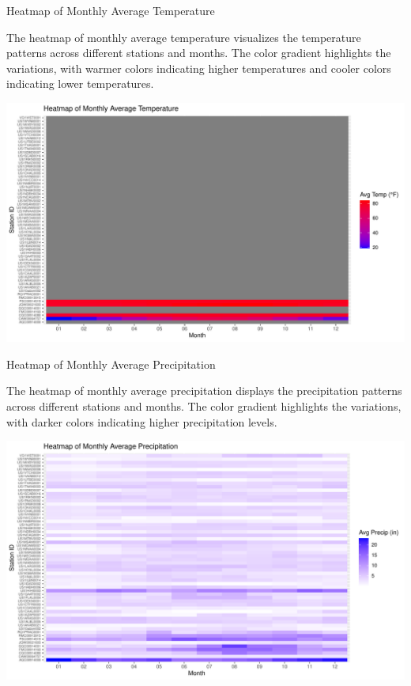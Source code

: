 \documentclass[
]{article}
\begin{document}
Heatmap of Monthly Average Temperature

\justifying

The heatmap of monthly average temperature visualizes the temperature
patterns across different stations and months. The color gradient
highlights the variations, with warmer colors indicating higher
temperatures and cooler colors indicating lower temperatures.

\includegraphics{climate_files/figure-latex/monthly_avg_temp_heatmap-1.pdf}

Heatmap of Monthly Average Precipitation

\justifying

The heatmap of monthly average precipitation displays the precipitation
patterns across different stations and months. The color gradient
highlights the variations, with darker colors indicating higher
precipitation levels.

\includegraphics{climate_files/figure-latex/monthly_avg_precip_heatmap-1.pdf}

\justifying
\end{document}

